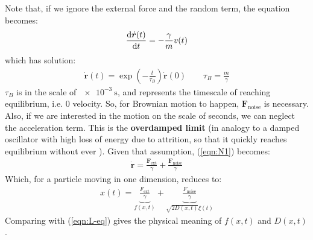 \documentclass[../template.tex]{subfiles}
\begin{document}
Note that, if we ignore the external force and the random term, the equation becomes:
\begin{align*}
    \dv{\dot{\bm{r}}(t)}{t} = -\frac{\gamma}{m} v(t) 
\end{align*}
which has solution:
\begin{align*}
    \dot{\bm{r}}(t) = \exp\left(-\frac{t}{\tau_B} \right) \dot{\bm{r}}(0) \qquad \tau_B = \frac{m}{\gamma} 
\end{align*}
$\tau_B$ is in the scale of $\SI{e-3}{\s}$, and represents the timescale of reaching equilibrium, i.e. $0$ velocity. So, for Brownian motion to happen, $\bm{F}_{\mathrm{noise}}$ is necessary. Also, if we are interested in the motion on the scale of seconds, we can neglect the acceleration term. This is the \textbf{overdamped limit} (in analogy to a damped oscillator with high loss of energy due to attrition, so that it quickly reaches equilibrium without ever ). Given that assumption, (\ref{eqn:N1}) becomes: 
\begin{align*}
    \dot{\bm{r}} = {\frac{\bm{F}_{\mathrm{ext} }}{\gamma}}  + \frac{\bm{F}_{\mathrm{noise} }}{\gamma}
\end{align*}
Which, for a particle moving in one dimension, reduces to:
\begin{align*}
    x(t) = \underbrace{\frac{F_{\mathrm{ext}}}{\gamma}}_{f(x,t)}  + \underbrace{\frac{F_{\mathrm{noise}}}{\gamma}}_{\sqrt{2 D(x,t)}\xi(t)}   
\end{align*}
Comparing with (\ref{eqn:L-eq}) gives the physical meaning of $f(x,t)$ and $D(x,t)$.
\end{document}
